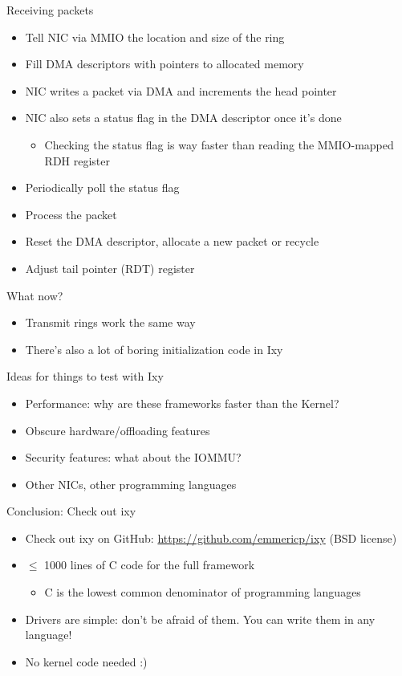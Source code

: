 \documentclass[NET,english,aspectratio=169,notitleframe]{tumbeamer}
\begin{document}
\begin{frame}{Receiving packets}
\begin{itemize}
\item Tell NIC via MMIO the location and size of the ring
\item Fill DMA descriptors with pointers to allocated memory
\end{itemize}
\pause
\begin{itemize}
\item NIC writes a packet via DMA and increments the head pointer
\item NIC also sets a status flag in the DMA descriptor once it's done
\begin{itemize}
\item Checking the status flag is way faster than reading the MMIO-mapped RDH register
\end{itemize}
\pause
\item Periodically poll the status flag
\item Process the packet
\item Reset the DMA descriptor, allocate a new packet or recycle
\item Adjust tail pointer (RDT) register
\end{itemize}
\end{frame}

\begin{frame}{What now?}
\begin{itemize}
\item Transmit rings work the same way
\item There's also a lot of boring initialization code in Ixy
\end{itemize}
\pause
Ideas for things to test with Ixy
\begin{itemize}
\item Performance: why are these frameworks faster than the Kernel?
\item Obscure hardware/offloading features
\item Security features: what about the IOMMU?
\item Other NICs, other programming languages
\end{itemize}
\end{frame}


\begin{frame}{Conclusion: Check out ixy}
\centering {}
\begin{itemize}
\item Check out ixy on GitHub: \url{https://github.com/emmericp/ixy} (BSD license)
\item $\le$ 1000 lines of C code for the full framework
\begin{itemize}
	\item C is the lowest common denominator of programming languages
\end{itemize}
\item Drivers are simple: don't be afraid of them. You can write them in any language!
\item No kernel code needed :)
\end{itemize}
\end{frame}
\end{document}
